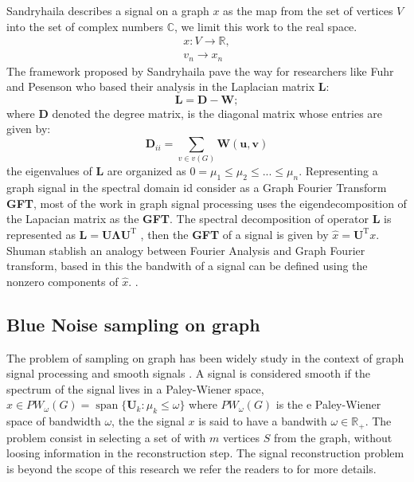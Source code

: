 \documentclass[12 pt]{IEEEtran}
\DeclareMathOperator*{\span}{span}
\begin{document}
Sandryhaila \cite{sandryhaila2013discrete} describes a signal on a graph $x$ as the map from the set of vertices $V$ into the set of complex numbers $\mathbb{C}$, we limit this work to the real space.
\begin{equation}
    \begin{split}
        x:V\rightarrow \mathbb{R},\\
        v_{n}\rightarrow x_{n}
    \end{split}
\end{equation}
The framework proposed by Sandryhaila pave the way for researchers   like  Fuhr
and Pesenson \cite{pesenson2015sampling,pesenson2010sampling,Fur} who based their analysis in the Laplacian matrix $\mathbf{L}$:
\begin{equation}
    \mathbf{L}=\mathbf{D}-\mathbf{W};
\end{equation}
 where  $\mathbf{D}$ denoted the degree matrix, is the diagonal matrix whose entries are given by:
\begin{equation}
    \mathbf{D}_{ii}=\sum_{v\in v(G)}\mathbf{W(u,v)}
\end{equation}
the eigenvalues of $\mathbf{L}$ are organized as $0=\mu_{1}\leq\mu_{2}\leq ...\leq \mu_{n}$\cite{biyikoglu2007laplacian}. Representing a graph signal in the spectral domain id consider as a Graph Fourier Transform \textbf{GFT}, most of the work in graph signal processing uses the eigendecomposition of the  Lapacian matrix as the \textbf{GFT}. The spectral decomposition of operator $\mathbf{L}$ is represented as $\mathbf{L}=\mathbf{U}\mathbf{\Lambda}\mathbf{U}^{\mathrm{T}}$ \cite{djuric2018cooperative}, then the \textbf{GFT} of a signal is given by $\widehat{x}=\mathbf{U}^{\mathrm{T}}x$. Shuman \cite{shuman2013emerging} stablish an  analogy between Fourier Analysis and Graph Fourier transform, based in this the bandwith of a signal can be defined using the nonzero components of $\widehat{x}$. .

\subsection{Blue Noise sampling on graph}

The problem of sampling on graph has been 
widely study in the context of graph signal processing and smooth signals \cite{pesenson2008samplingpes,pesenson2010sampling,anis2016efficient}. A signal is considered smooth if the spectrum of the signal lives in a Paley-Wiener space,  $\widehat{x} \in PW_{\omega}(G)=\span\{\mathbf{U}_{k}:\mu_{k} \leq \omega\}$ where $PW_{\omega}(G)$ is the e Paley-Wiener space of bandwidth $\omega$, the the signal $x$ is said to have a bandwith $\omega \in \mathbb{R}_{+}$. The problem consist in selecting a set of with $m$ vertices $S$ from the graph, without loosing information in the reconstruction step. The signal reconstruction problem is beyond the scope of this research we refer the readers to \cite{anis2016efficient} for more details.
\end{document}
